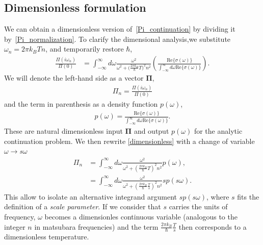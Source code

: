 \documentclass[notitlepage,11pt,nofootinbib]{revtex4-1}
\renewcommand{\vec}[1]{\bm{#1}}
\begin{document}
\subsection{Dimensionless formulation}
We can obtain a dimensionless version of~\eqref{Pi_continuation} by dividing it by~\eqref{Pi_normalization}. To clarify the dimensional analysis,we substitute $\omega_n = 2\pi k_BTn$, and temporarily restore $\hbar$,
\begin{align}
\frac{\Pi(i\omega_n)}{\Pi(0)}
&=
\int_{-\infty}^{\infty} d\omega \frac{\omega^2}{
\omega^2+
\big(\frac{2\pi k_B}{\hbar}T\big)
^2n^2
}\left(
\frac{\text{Re}\{ \sigma(\omega) \}}
{\int_{-\infty}^{\infty} d\omega \text{Re}\{ \sigma(\omega) \}}
\right).
\label{dimensionless}
\end{align}
We will denote the left-hand side as a vector $\vec \Pi$, \begin{align}
\Pi_n = \frac{\Pi(i\omega_n)}{\Pi(0)} 
\end{align}
and the term in parenthesis as a density function $p(\omega)$,
\begin{align}
p(\omega) =
\frac{\text{Re}\{ \sigma(\omega) \}}
{\int_{-\infty}^{\infty} d\omega \text{Re}\{ \sigma(\omega) \}}.
\label{eq_def_density}
\end{align}
These are natural dimensionless input $\vec\Pi$ and output $p(\omega)$ for the analytic continuation problem. We then rewrite \eqref{dimensionless} with a change of variable $\omega\rightarrow s\omega$
\begin{align}
\Pi_n
&=
\int_{-\infty}^{\infty} d\omega \frac{\omega^2}{\omega^2 + \left(\frac{2\pi k_B}{\hbar}T\right)^2n^2}
p(\omega),
\label{dimensionless_with_p1}
\\
&=
\int_{-\infty}^{\infty} d\omega \frac{\omega^2}{\omega^2 + \left(\frac{2\pi k_B}{\hbar}\frac{T}{s}\right)^2n^2}
sp(s\omega).
\label{dimensionless_with_p2}
\end{align}
This allow to isolate an alternative integrand argument $sp(s\omega)$, where $s$ fits the definition of a \emph{scale parameter}.
If we consider that $s$ carries the units of frequency, $\omega$ becomes a dimensionles continuous variable (analogous to the integer $n$ in matsubara frequencies) and the term $\frac{2\pi k_B}{\hbar}\frac{T}{s}$ then corresponds to a dimensionless temperature.
\end{document}
